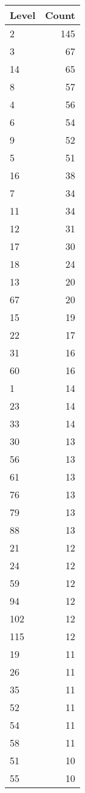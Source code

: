 \begin{table}[ht]
\centering
\begin{tabular}{lr}
  \hline
Level & Count \\ 
  \hline
2 & 145 \\ 
  3 &  67 \\ 
  14 &  65 \\ 
  8 &  57 \\ 
  4 &  56 \\ 
  6 &  54 \\ 
  9 &  52 \\ 
  5 &  51 \\ 
  16 &  38 \\ 
  7 &  34 \\ 
  11 &  34 \\ 
  12 &  31 \\ 
  17 &  30 \\ 
  18 &  24 \\ 
  13 &  20 \\ 
  67 &  20 \\ 
  15 &  19 \\ 
  22 &  17 \\ 
  31 &  16 \\ 
  60 &  16 \\ 
  1 &  14 \\ 
  23 &  14 \\ 
  33 &  14 \\ 
  30 &  13 \\ 
  56 &  13 \\ 
  61 &  13 \\ 
  76 &  13 \\ 
  79 &  13 \\ 
  88 &  13 \\ 
  21 &  12 \\ 
  24 &  12 \\ 
  59 &  12 \\ 
  94 &  12 \\ 
  102 &  12 \\ 
  115 &  12 \\ 
  19 &  11 \\ 
  26 &  11 \\ 
  35 &  11 \\ 
  52 &  11 \\ 
  54 &  11 \\ 
  58 &  11 \\ 
  51 &  10 \\ 
  55 &  10 \\ 

\end{tabular}
\end{table}
